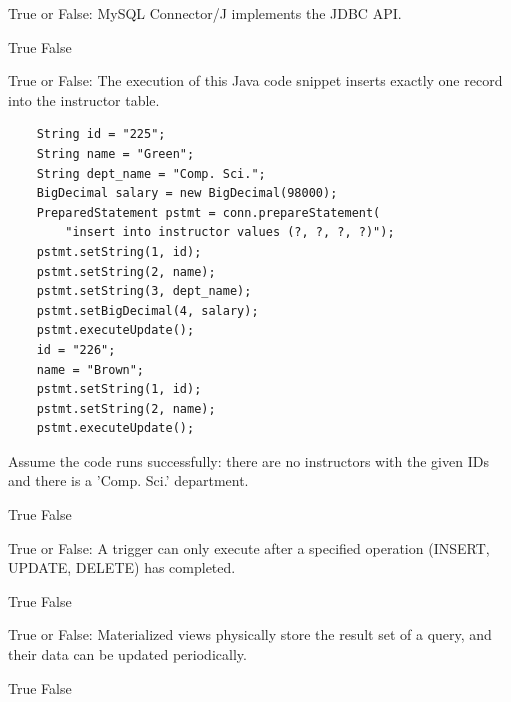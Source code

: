 \documentclass[12pt, addpoints, answers]{exam}
\begin{document}
\begin{questions}
\begin{minipage}{\linewidth}
\question[2]
True or False: MySQL Connector/J implements the JDBC API.\par\vspace{0.5em}
\begin{checkboxes}
    \CorrectChoice True
    \choice False
\end{checkboxes}
\end{minipage}\vspace{1em}

\begin{minipage}{\linewidth}
\question[4]
True or False: The execution of this Java code snippet inserts exactly one record into the instructor table.\par\vspace{0.5em}
\begin{verbatim}
	String id = "225";
	String name = "Green";
	String dept_name = "Comp. Sci.";
	BigDecimal salary = new BigDecimal(98000);
	PreparedStatement pstmt = conn.prepareStatement(
        "insert into instructor values (?, ?, ?, ?)");
	pstmt.setString(1, id);
	pstmt.setString(2, name);
	pstmt.setString(3, dept_name);
	pstmt.setBigDecimal(4, salary);
	pstmt.executeUpdate();
	id = "226";
	name = "Brown";
	pstmt.setString(1, id);
	pstmt.setString(2, name);
	pstmt.executeUpdate();
\end{verbatim}
Assume the code runs successfully: there are no instructors with the given IDs and there is a 'Comp. Sci.' department.\par\vspace{0.5em}
\begin{checkboxes}
    \choice True
    \CorrectChoice False
\end{checkboxes}
\end{minipage}\vspace{1em}

\begin{minipage}{\linewidth}
\question[2]
True or False: A trigger can only execute after a specified operation (INSERT, UPDATE, DELETE) has completed.\par\vspace{0.5em}
\begin{checkboxes}
    \choice True
    \CorrectChoice False
\end{checkboxes}
\end{minipage}\vspace{1em}

\begin{minipage}{\linewidth}
\question[2]
True or False: Materialized views physically store the result set of a query, and their data can be updated periodically.\par\vspace{0.5em}
\begin{checkboxes}
    \CorrectChoice True
    \choice False
\end{checkboxes}
\end{minipage}\vspace{1em}


\end{questions}
\end{document}
